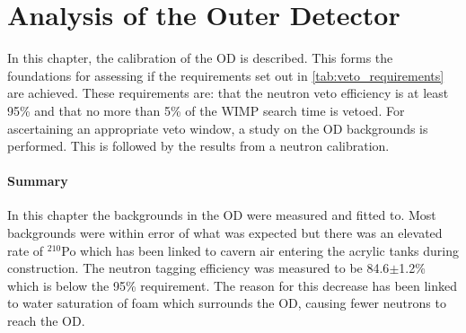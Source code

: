 \chapter{Analysis of the Outer Detector} \label{chap:analysis_of_the_od}

\par
In this chapter, the calibration of the OD is described.
This forms the foundations for assessing if the requirements set out in \autoref{tab:veto_requirements} are achieved.
These requirements are: that the neutron veto efficiency is at least 95\% and that no more than 5\% of the WIMP search time is vetoed.
For ascertaining an appropriate veto window, a study on the OD backgrounds is performed. 
This is followed by the results from a neutron calibration.



\clearpage

\clearpage


%

\subsubsection*{Summary}
\par
In this chapter the backgrounds in the OD were measured and fitted to.
Most backgrounds were within error of what was expected but there was an elevated rate of ${}^{210}$Po which has been linked to cavern air entering the acrylic tanks during construction.
The neutron tagging efficiency was measured to be 84.6$\pm$1.2\% which is below the 95\% requirement.
The reason for this decrease has been linked to water saturation of foam which surrounds the OD, causing fewer neutrons to reach the OD.